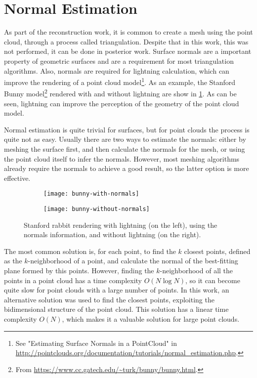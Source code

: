 \section{Normal Estimation}
\label{section:normal-estimation}

As part of the reconstruction work, it is common to create a mesh using the point cloud, through a process called triangulation. Despite that in this work, this was not performed, it can be done in posterior work. Surface normals are a important property of geometric surfaces and are a requirement for most triangulation algorithms. Also, normals are required for lightning calculation, which can improve the rendering of a point cloud model\footnote{See "Estimating Surface Normals in a PointCloud" in \url{http://pointclouds.org/documentation/tutorials/normal_estimation.php}.}. As an example, the Stanford Bunny model\footnote{From \url{https://www.cc.gatech.edu/~turk/bunny/bunny.html}.} rendered with and without lightning are show in \cref{figure:bunny-normals}. As can be seen, lightning can improve the perception of the geometry of the point cloud model.

Normal estimation is quite trivial for surfaces, but for point clouds the process is quite not as easy. Usually there are two ways to estimate the normals: either by meshing the surface first, and then calculate the normals for the mesh, or using the point cloud itself to infer the normals. However, most meshing algorithms already require the normals to achieve a good result, so the latter option is more effective.

\begin{figure}[h]
    
    \centering
    \begin{subfigure}{0.4\textwidth}
        \centering
        \texttt{[image: bunny-with-normals]}     
    \end{subfigure}%
    \begin{subfigure}{0.4\textwidth}
        \centering
        \texttt{[image: bunny-without-normals]}     
    \end{subfigure}

    \caption{Stanford rabbit rendering with lightning (on the left), using the normals information, and without lightning (on the right).}
    \label{figure:bunny-normals}

\end{figure}

The most common solution is, for each point, to find the $k$ closest points, defined as the $k$-neighborhood of a point, and calculate the normal of the best-fitting plane formed by this points. However, finding the $k$-neighborhood of all the points in a point cloud has a time complexity $O(N \log N)$, so it can become quite slow for point clouds with a large number of points. In this work, an alternative solution was used to find the closest points, exploiting the bidimensional structure of the point cloud. This solution has a linear time complexity $O(N)$, which makes it a valuable solution for large point clouds.

